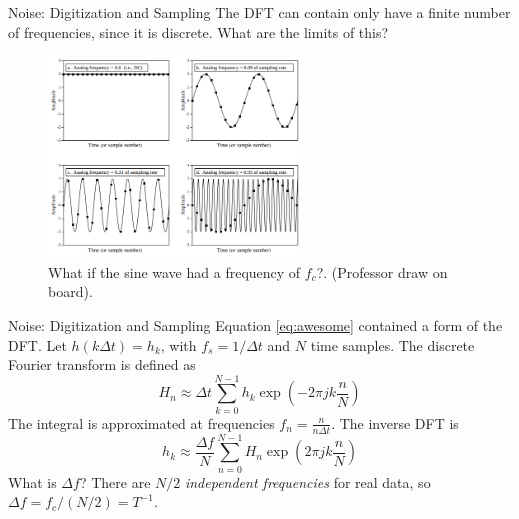 \documentclass{beamer}
\begin{document}
\begin{frame}{Noise: Digitization and Sampling}
The DFT can contain only have a finite number of frequencies, since it is discrete.  What are the limits of this?
\begin{figure}
\centering
\includegraphics[width=0.6\textwidth]{figures/sampling.png}
\caption{\label{fig:sampling2} What if the sine wave had a frequency of $f_{c}$?. (Professor draw on board).}
\end{figure}
\end{frame}

\begin{frame}{Noise: Digitization and Sampling}
Equation \ref{eq:awesome} contained a form of the DFT.  Let $h(k\Delta t) = h_k$, with $f_s = 1/\Delta t$ and $N$ time samples. The discrete Fourier transform is defined as
\begin{equation}
H_n \approx \Delta t \sum_{k=0}^{N-1} h_k \exp\left( -2\pi j k \frac{n}{N} \right) \label{eq:fft1}
\end{equation}
The integral is approximated at frequencies $f_n = \frac{n}{n\Delta t}$. The inverse DFT is
\begin{equation}
h_k \approx \frac{\Delta f}{N}\sum_{n=0}^{N-1} H_n \exp\left( 2\pi j k \frac{n}{N} \right) \label{eq:fft2}
\end{equation}
What is $\Delta f$? There are $N/2$ \textit{independent frequencies} for real data, so $\Delta f = f_c/(N/2) = T^{-1}$.
\end{frame}
\end{document}
